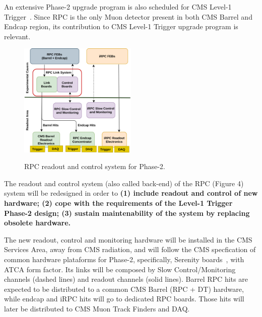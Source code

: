 An extensive Phase-2 upgrade program is also scheduled for CMS Level-1 Trigger~\cite{l1_tdr}. Since RPC is the only Muon detector present in both CMS Barrel and Endcap region, its contribution to CMS Level-1 Trigger upgrade program is relevant. 

\begin{figure}
    \caption{RPC readout and control system for Phase-2.}
    \includegraphics[width=0.5\textwidth]{uioposter-images/rpc_phase2_readout.png}
    \label{rpc_phase2_readout}
\end{figure}

The readout and control system (also called back-end) of the RPC (Figure 4) system will be redesigned in order to \textbf{(1) include readout and control of new hardware; (2) cope with the requirements of the Level-1 Trigger Phase-2 design; (3) sustain maintenability of the system by replacing obsolete hardware.}


The new readout, control and monitoring hardware will be installed in the CMS Services Area, away from CMS radiation, and will follow the CMS specfication of common hardware plataforms for Phase-2, specifically, Serenity boards~\cite{serenity}, with ATCA form factor. Its links will be composed by Slow Control/Monitoring channels (dashed lines) and readout channels (solid lines). Barrel RPC hits are expected to be distributed to a common CMS Barrel (RPC + DT) hardware, while endcap and iRPC hits will go to dedicated RPC boards. Those hits will later be distributed to CMS Muon Track Finders and DAQ.

